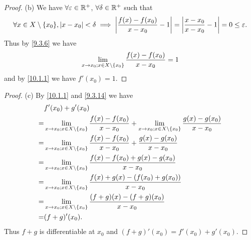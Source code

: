 \begin{proof}{(b)}
  We have \(\forall \varepsilon \in \mathbb{R}^+\), \(\forall \delta \in \mathbb{R}^+\) such that
  \[
    \forall x \in X \setminus \set{x_0}, \abs{x - x_0} < \delta \implies \abs{\dfrac{f(x) - f(x_0)}{x - x_0} - 1} = \abs{\dfrac{x - x_0}{x - x_0} - 1} = 0 \leq \varepsilon.
  \]
  Thus by \cref{9.3.6} we have
  \[
    \lim_{x \to x_0 ; x \in X \setminus \left\lbrace x_0\right\rbrace} \dfrac{f(x) - f(x_0)}{x - x_0} = 1
  \]
  and by \cref{10.1.1} we have \(f'(x_0) = 1\).
\end{proof}

\begin{proof}{(c)}
  By \cref{10.1.1} and \cref{9.3.14} we have
  \begin{align*}
      & f'(x_0) + g'(x_0)                                                                                                                                             \\
    = & \lim_{x \to x_0 ; x \in X \setminus \left\lbrace x_0\right\rbrace} \dfrac{f(x) - f(x_0)}{x - x_0} + \lim_{x \to x_0 ; x \in X \setminus \left\lbrace x_0\right\rbrace} \dfrac{g(x) - g(x_0)}{x - x_0} \\
    = & \lim_{x \to x_0 ; x \in X \setminus \left\lbrace x_0\right\rbrace} \dfrac{f(x) - f(x_0)}{x - x_0} + \dfrac{g(x) - g(x_0)}{x - x_0}                                                \\
    = & \lim_{x \to x_0 ; x \in X \setminus \left\lbrace x_0\right\rbrace} \dfrac{f(x) - f(x_0) + g(x) - g(x_0)}{x - x_0}                                                                 \\
    = & \lim_{x \to x_0 ; x \in X \setminus \left\lbrace x_0\right\rbrace} \dfrac{f(x) + g(x) - (f(x_0) + g(x_0))}{x - x_0}                                                               \\
    = & \lim_{x \to x_0 ; x \in X \setminus \left\lbrace x_0\right\rbrace} \dfrac{(f + g)(x) - (f + g)(x_0)}{x - x_0}                                                                     \\
    = & (f + g)'(x_0).
  \end{align*}
  Thus \(f + g\) is differentiable at \(x_0\) and \((f + g)'(x_0) = f'(x_0) + g'(x_0)\).
\end{proof}

